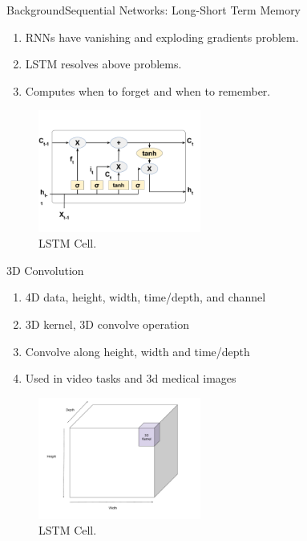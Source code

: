 \documentclass[handout]{beamer}
\begin{document}
\begin{frame}{Background}{Sequential Networks: Long-Short Term Memory}
  \begin{enumerate}
    \item RNNs have vanishing and exploding gradients problem.
    \item LSTM resolves above problems.
    \item Computes when to forget and when to remember.
  \end{enumerate}
  \begin{center}
    \begin{figure}
    \includegraphics[width=0.6\linewidth, height=4cm]{images/lstm}
    \caption{LSTM Cell.}
    \end{figure}
  \end{center}
\end{frame}

\begin{frame}{3D Convolution}
  \begin{enumerate}
    \item 4D data, height, width, time/depth, and channel
    \item 3D kernel, 3D convolve operation
    \item Convolve along height, width and time/depth
    \item Used in video tasks and 3d medical images
  \end{enumerate}
  \begin{center}
    \begin{figure}
    \includegraphics[width=0.6\linewidth, height=4cm]{images/3dconvolution}
    \caption{LSTM Cell.}
    \end{figure}
  \end{center}
\end{frame}
\end{document}
